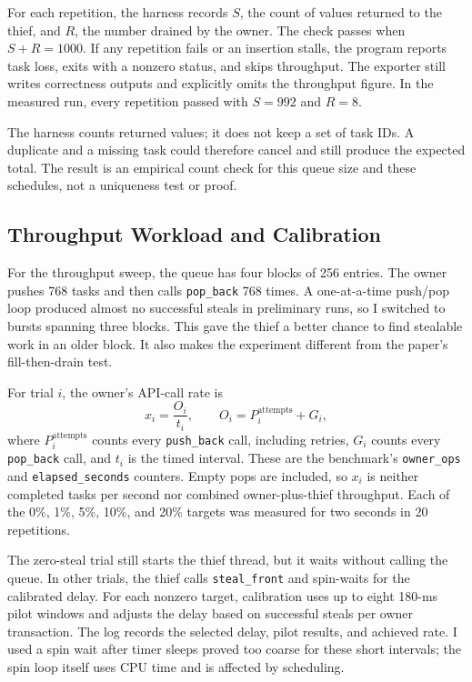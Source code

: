\documentclass[conference]{IEEEtran}
\begin{document}
For each repetition, the harness records $S$, the count of values returned to the thief, and $R$, the number drained by the owner. The check passes when $S+R=1000$. If any repetition fails or an insertion stalls, the program reports task loss, exits with a nonzero status, and skips throughput. The exporter still writes correctness outputs and explicitly omits the throughput figure. In the measured run, every repetition passed with $S=992$ and $R=8$.

The harness counts returned values; it does not keep a set of task IDs. A duplicate and a missing task could therefore cancel and still produce the expected total. The result is an empirical count check for this queue size and these schedules, not a uniqueness test or proof.

\subsection{Throughput Workload and Calibration}
For the throughput sweep, the queue has four blocks of 256 entries. The owner pushes 768 tasks and then calls \texttt{pop\_back} 768 times. A one-at-a-time push/pop loop produced almost no successful steals in preliminary runs, so I switched to bursts spanning three blocks. This gave the thief a better chance to find stealable work in an older block. It also makes the experiment different from the paper's fill-then-drain test.

For trial $i$, the owner's API-call rate is
\begin{equation}
  x_i=\frac{O_i}{t_i},\qquad O_i=P_i^{\mathrm{attempts}}+G_i,
\end{equation}
where $P_i^{\mathrm{attempts}}$ counts every \texttt{push\_back} call, including retries, $G_i$ counts every \texttt{pop\_back} call, and $t_i$ is the timed interval. These are the benchmark's \texttt{owner\_ops} and \texttt{elapsed\_seconds} counters. Empty pops are included, so $x_i$ is neither completed tasks per second nor combined owner-plus-thief throughput. Each of the 0\%, 1\%, 5\%, 10\%, and 20\% targets was measured for two seconds in 20 repetitions.

The zero-steal trial still starts the thief thread, but it waits without calling the queue. In other trials, the thief calls \texttt{steal\_front} and spin-waits for the calibrated delay. For each nonzero target, calibration uses up to eight 180-ms pilot windows and adjusts the delay based on successful steals per owner transaction. The log records the selected delay, pilot results, and achieved rate. I used a spin wait after timer sleeps proved too coarse for these short intervals; the spin loop itself uses CPU time and is affected by scheduling.
\end{document}
